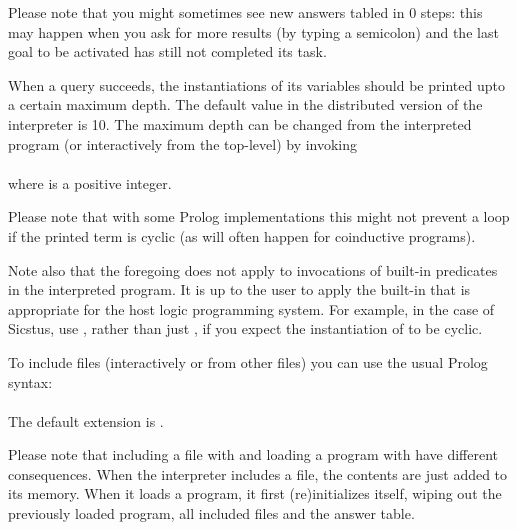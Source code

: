 Please note that you might sometimes see new answers tabled in 0 steps: this
may happen when you ask for more results (by typing a semicolon) and the last
goal to be activated has still not completed its task.

When a query succeeds, the instantiations of its variables should be printed
upto a certain maximum depth.  The default value in the distributed version
of the interpreter is 10.  The maximum depth can be changed from the
interpreted program (or interactively from the top-level) by invoking\\
\ind{}\\
where  is a positive integer.

Please note that with some Prolog implementations this might not prevent a
loop if the printed term is cyclic (as will often happen for coinductive
programs).

Note also that the foregoing does not apply to invocations of built-in
predicates in the interpreted program.  It is up to the user to apply the
built-in that is appropriate for the host logic programming system.  For
example, in the case of Sicstus, use
, rather than just , if you expect the instantiation of  to be cyclic.




To include files (interactively or from other files) you can use the usual
Prolog syntax:\\
\ind
{}%
\label{dir:include}\\
The default extension is .%
%

Please note that including a file with   and
loading a program with  have different
consequences. When the interpreter includes a file, the contents are just
added to its memory. When it loads a program, it first (re)initializes
itself, wiping out the previously loaded program, all included files and the
answer table.



